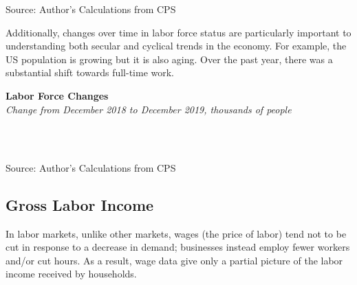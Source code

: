 \documentclass{report}
\begin{document}
{{{{\begin{minipage}{0.76\textwidth}
\vspace{-3mm}		
		
\footnotesize{Source: Author's Calculations from CPS}\\

\vspace{3mm}

\small Additionally, changes over time in labor force status are particularly important to understanding both secular and cyclical trends in the economy. For example, the US population is growing but it is also aging. Over the past year, there was a substantial shift towards full-time work. \\

\vspace{2mm}


\noindent \normalsize \textbf{Labor Force Changes}\\
\footnotesize{\textit{Change from December 2018 to December 2019, thousands of people}}\\

\vspace{-3mm}

\noindent {} \setlength{\tabcolsep}{3.0pt} \color{black!90}
		{\renewcommand{\arraystretch}{1.52}
		 \begin{tabular}{p{27.8mm} R{11.2mm} R{10.4mm} R{10.4mm} R{10.2mm} R{10.6mm} R{10.4mm} R{10.4mm}}
			 \hline
		\end{tabular}
		}	\\
		
\vspace{-3mm}	
	
\footnotesize{Source: Author's Calculations from CPS}


\end{minipage}

\newpage

\begin{minipage}{0.76\textwidth}


\subsection*{\color{black!70} \seriffont Gross Labor Income}

\small In labor markets, unlike other markets, wages (the price of labor) tend not to be cut in response to a decrease in demand; businesses instead employ fewer workers and/or cut hours. As a result, wage data give only a partial picture of the labor income received by households.\\


\end{minipage}}}}}
\end{document}
